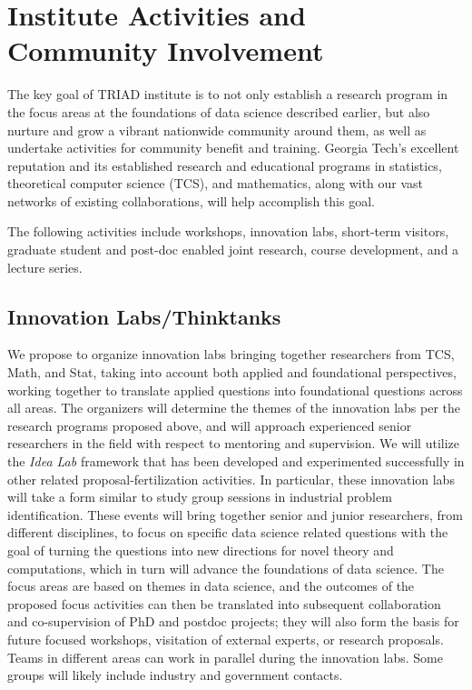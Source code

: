 \documentclass[12pt]{article}
\begin{document}
\vspace*{-1em}


\section{Institute Activities and Community Involvement}
The key goal of TRIAD institute is to not only establish a research program in the focus
areas at the foundations of data science described earlier, but also nurture and grow a
vibrant nationwide community around them, as well as undertake activities for community
benefit and training. Georgia Tech's excellent reputation and its established research and
educational programs in statistics, theoretical computer science (TCS), and mathematics,
along with our vast networks of existing collaborations, will help accomplish this goal.


The following activities include workshops,
innovation labs,
short-term visitors,
graduate student and post-doc enabled joint research,
course development, and
a lecture series.



\vspace*{-1em}

\subsection{Innovation Labs/Thinktanks}
\label{sec:idea-labs}
We propose to organize innovation labs bringing together researchers from TCS, Math, and Stat, taking into account both applied and foundational perspectives, working together to translate applied questions into foundational questions across all areas.
The organizers will determine the themes of the innovation labs per the research programs proposed above, and will approach experienced senior researchers in the field with respect to mentoring and supervision.
We will utilize the {\em Idea Lab} framework that has been developed and experimented successfully in other related proposal-fertilization activities.
In particular, these innovation labs will take a form similar to study group sessions in industrial problem identification. These events will bring together senior and junior researchers, from different disciplines, to focus on specific data science related questions with the goal of turning the questions into new directions for novel theory and computations, which in turn will advance the foundations of data science.
The focus areas are based on themes in data science, and the outcomes of the proposed focus activities can then be translated into subsequent collaboration and co-supervision of  PhD and postdoc projects; they will also form the basis for future focused workshops, visitation of external experts, or research proposals.
Teams in different areas can work in parallel during the innovation labs. Some groups will likely include industry and government contacts.
\end{document}
